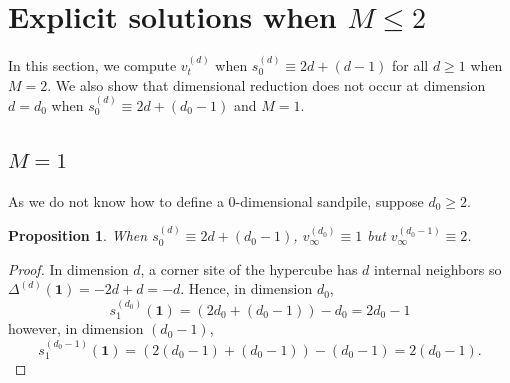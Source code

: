\documentclass[12pt]{amsart}
\newtheorem{prop}{Proposition}[section]
\begin{document}
	
	
	\section{Explicit solutions when \texorpdfstring{$M \leq 2$}{M <= 2}} \label{sec:base_case}
	
	In this section, we compute $v_t^{(d)}$ when $s_0^{(d)} \equiv 2 d + (d-1)$ for all $d \geq 1$ when $M=2$.
	We also show that dimensional reduction does not occur at dimension
	$d=d_0$ when $s^{(d)}_0 \equiv 2 d + (d_0-1)$ and $M=1$. 
	
	
	
	\subsection{\texorpdfstring{$M=1$}{M=1}} \label{subsec:M1}
	As we do not know how to define a $0$-dimensional sandpile, suppose $d_0 \geq 2$. 
	\begin{prop}\label{no_reduction}
	 When $s_0^{(d)} \equiv 2 d + (d_0-1)$,  $v_\infty^{(d_0)} \equiv 1$ but $v_\infty^{(d_0-1)} \equiv 2$.
	\end{prop}
	\begin{proof} 
		In dimension $d$, a corner site of the hypercube has $d$ internal neighbors so 
		$\Delta^{(d)} (\mathbf{1}) = - 2 d + d = -d $.
		Hence, in dimension $d_0$, 
		\[
		s_1^{(d_0)}(\mathbf{1}) = (2 d_0 + (d_0-1))- d_0 = 2 d_0 - 1
		\]
		however, in dimension $(d_0-1)$, 
		\[
		s_1^{(d_0-1)}(\mathbf{1}) = (2 (d_0-1) + (d_0-1)) - (d_0-1) = 2(d_0-1).
		\]
	\end{proof}
	
	
\end{document}

